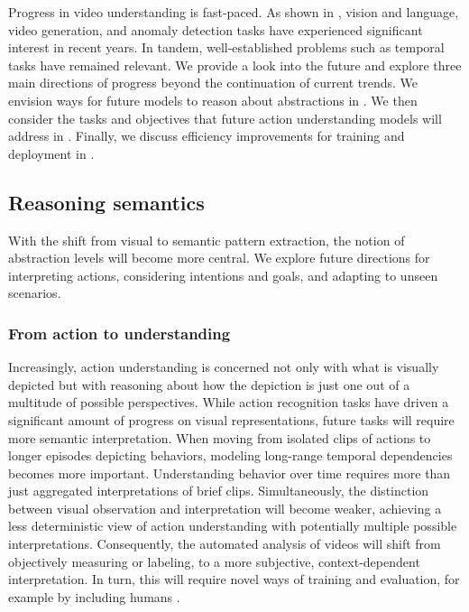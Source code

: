 Progress in video understanding is fast-paced. As shown in , vision and language, video generation, and anomaly detection tasks have experienced significant interest in recent years. In tandem, well-established problems such as temporal tasks have remained relevant. We provide a look into the future and explore three main directions of progress beyond the continuation of current trends. We envision ways for future models to reason about abstractions in . We then consider the tasks and objectives that future action understanding models will address in . Finally, we discuss efficiency improvements for training and deployment in .




\subsection{Reasoning semantics}
\label{sec:directions::reason}

With the shift from visual to semantic pattern extraction, the notion of abstraction levels will become more central. We explore future directions for interpreting actions, considering intentions and goals, and adapting to unseen scenarios. 

\subsubsection{From action to understanding}
\label{sec:directions::reason:::action2understanding}

Increasingly, action understanding is concerned not only with what is visually depicted but with reasoning about how the depiction is just one out of a multitude of possible perspectives. While action recognition tasks have driven a significant amount of progress on visual representations, future tasks will require more semantic interpretation. When moving from isolated clips of actions to longer episodes depicting behaviors, modeling long-range temporal dependencies becomes more important. Understanding behavior over time requires more than just aggregated interpretations of brief clips. Simultaneously, the distinction between visual observation and interpretation will become weaker, achieving a less deterministic view of action understanding with potentially multiple possible interpretations. Consequently, the automated analysis of videos will shift from objectively measuring or labeling, to a more subjective, context-dependent interpretation. In turn, this will require novel ways of training and evaluation, for example by including humans .

